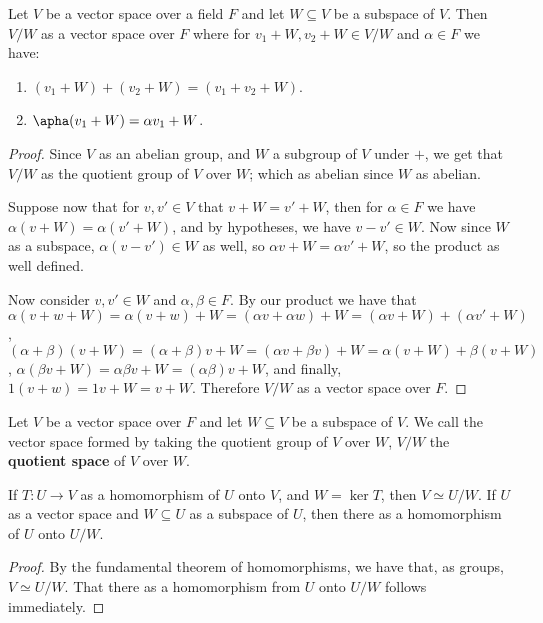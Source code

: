 \begin{lemma}\label{1.1.4}
    Let $V$ be a vector space over a field  $F$ and let  $W \subseteq V$ be a
    subspace of  $V$. Then  $V/W$ as a vector space over  $F$ where for $
    v_1+W,v_2+W \in V/W$ and $\alpha \in F$ we have:
        \begin{enumerate}[label=(\arabic*)]
            \item $(v_1+W)+(v_2+W)=(v_1+v_2+W)$.

            \item $\apha(v_1+W)=\alpha v_1+W$.
        \end{enumerate}
\end{lemma}
\begin{proof}
    Since $V$ as an abelian group, and  $W$ a subgroup of  $V$ under  $+$, we
    get that  $V/W$ as the quotient group of  $V$ over  $W$; which as abelian
    since  $W$ as abelian.

    Suppose now that for $v,v' \in V$ that  $v+W=v'+W$, then for  $\alpha \in F$
    we have  $\alpha(v+W)=\alpha(v'+W)$, and by hypotheses, we have $v-v' \in
    W$. Now since  $W$ as a subspace,  $\alpha(v-v') \in W$ as well, so $\alpha
    v+W=\alpha v'+W$, so the product as well defined.

    Now consider  $v,v' \in W$ and  $\alpha, \beta \in F$. By our product we
    have that  $\alpha(v+w+W)=\alpha(v+w)+W=(\alpha v+ \alpha w)+W=(\alpha
    v+W)+(\alpha v'+W)$, $(\alpha+\beta)(v+W)=(\alpha+\beta)v+W=(\alpha v+\beta
    v)+W=\alpha(v+W)+\beta(v+W)$, $\alpha(\beta v+W)=\alpha\beta v+W=(\alpha\beta)
    v+W$, and finally, $1(v+w)=1v+W=v+W$. Therefore $V/W$ as a vector space over
     $F$.
\end{proof}

\begin{definition}
    Let $V$ be a vector space over  $F$ and let  $W \subseteq V$ be a subspace
    of  $V$. We call the vector space formed by taking the quotient group of
    $V$ over  $W$,  $V/W$ the  \textbf{quotient space} of $V$ over  $W$.
\end{definition}

\begin{theorem}\label{1.1.5}
    If $T:U \rightarrow V$ as a homomorphism of $U$ onto  $V$, and  $W=\ker{T}$,
    then $V \simeq U/W$. If  $U$ as a vector space and  $W \subseteq U$ as a
    subspace of  $U$, then  there as a homomorphism of  $U$ onto  $U/W$.
\end{theorem}
\begin{proof}
    By the fundamental theorem of homomorphisms, we have that, as groups, $V
    \simeq U/W$. That there as a homomorphism from  $U$ onto  $U/W$ follows
    immediately.
\end{proof}

